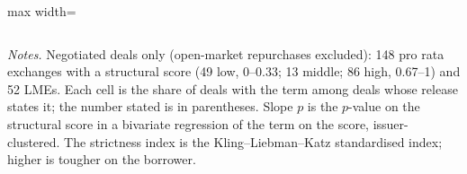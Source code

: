 \begin{table}[htbp]
\begin{adjustbox}{max width=\textwidth}
\begin{tabular}{l rrr c r}
\bottomrule
\end{tabular}
\end{adjustbox}
\begin{minipage}{0.95\textwidth}\vspace{4pt}\footnotesize
\textit{Notes.} Negotiated deals only (open-market repurchases excluded): 148 pro rata exchanges with a structural score (49 low, 0--0.33; 13 middle; 86 high, 0.67--1) and 52 LMEs. Each cell is the share of deals with the term among deals whose release states it; the number stated is in parentheses. Slope $p$ is the $p$-value on the structural score in a bivariate regression of the term on the score, issuer-clustered. The strictness index is the Kling--Liebman--Katz standardised index; higher is tougher on the borrower.
\end{minipage}
\end{table}
